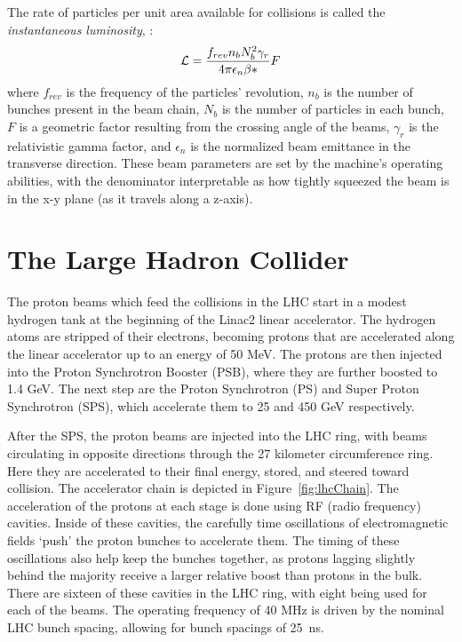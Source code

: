 The rate of particles per unit area available for collisions is called the \emph{instantaneous
luminosity}, \instlum:
\begin{equation}
    \mathcal{L} = \frac{f_{rev} n_b N_b^2 \gamma_r}{4\pi \epsilon_n \beta*} F
\end{equation}
where $f_{rev}$ is the frequency of the particles' revolution, $n_b$ is the number of
bunches present in the beam chain, $N_b$ is the number of particles in each
bunch, $F$ is a geometric factor resulting from the crossing angle of the beams,
$\gamma_r$ is the relativistic gamma factor, and $\epsilon_n$ is the normalized
beam emittance in the transverse direction. These beam parameters are set by the
machine's operating abilities, with the denominator interpretable as how tightly
squeezed the beam is in the x-y plane (as it travels along a z-axis).


\section{The Large Hadron Collider}
\label{section:theLHC}
The proton beams which feed the collisions in the LHC start in a modest hydrogen
tank at the beginning of the Linac2 linear accelerator. The hydrogen atoms are
stripped of their electrons, becoming protons that are accelerated along the
linear accelerator up to an energy of 50 MeV. The protons are then injected into
the Proton Synchrotron Booster (PSB), where they are further boosted to 1.4 GeV.
The next step are the Proton Synchrotron (PS) and Super Proton Synchrotron
(SPS), which accelerate them to 25 and 450 GeV respectively. 

After the SPS, the proton beams are injected into the LHC ring, with beams
circulating in opposite directions through the 27 kilometer circumference ring.
Here they are accelerated to their final energy, stored, and steered toward
collision.  The accelerator chain is depicted in Figure~\ref{fig:lhcChain}. The
acceleration of the protons at each stage is done using RF (radio frequency)
cavities. Inside of these cavities, the carefully time oscillations of
electromagnetic fields `push' the proton bunches to accelerate them. The timing
of these oscillations also help keep the bunches together, as protons lagging
slightly behind the majority receive a larger relative boost than protons in the
bulk.  There are sixteen of these cavities in the LHC ring, with eight being
used for each of the beams. The operating frequency of 40 MHz is driven by the
nominal LHC bunch spacing, allowing for bunch spacings of 25~ns.

